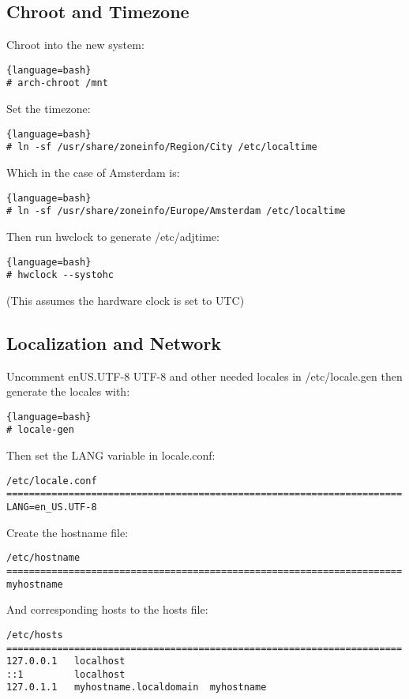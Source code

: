 \subsection{Chroot and Timezone}
Chroot into the new system:
\begin{lstlisting}{language=bash}
# arch-chroot /mnt
\end{lstlisting}
Set the timezone:
\begin{lstlisting}{language=bash}
# ln -sf /usr/share/zoneinfo/Region/City /etc/localtime
\end{lstlisting}
Which in the case of Amsterdam is:
\begin{lstlisting}{language=bash}
# ln -sf /usr/share/zoneinfo/Europe/Amsterdam /etc/localtime
\end{lstlisting}
Then run hwclock to generate /etc/adjtime:
\begin{lstlisting}{language=bash}
# hwclock --systohc
\end{lstlisting}
(This assumes the hardware clock is set to UTC)

\subsection{Localization and Network}
Uncomment en\textunderscore US.UTF-8 UTF-8 and other needed locales in /etc/locale.gen then generate the locales with:
\begin{lstlisting}{language=bash}
# locale-gen
\end{lstlisting}
Then set the LANG variable in locale.conf:
\begin{verbatim}
/etc/locale.conf
======================================================================
LANG=en_US.UTF-8
\end{verbatim}
Create the hostname file:
\begin{verbatim}
/etc/hostname
======================================================================
myhostname
\end{verbatim}
And corresponding hosts to the hosts file:
\begin{verbatim}
/etc/hosts
======================================================================
127.0.0.1   localhost
::1         localhost
127.0.1.1   myhostname.localdomain	myhostname
\end{verbatim}
